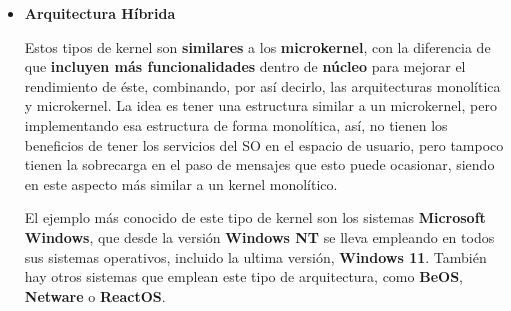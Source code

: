 \begin{itemize}
    \item \textbf{Arquitectura Híbrida}

    Estos tipos de kernel son \textbf{similares} a los \textbf{microkernel}, con la diferencia de que \textbf{incluyen más funcionalidades} dentro de \textbf{núcleo} para mejorar el rendimiento de éste, combinando, por así decirlo, las arquitecturas monolítica y microkernel. La idea es tener una estructura similar a un microkernel, pero implementando esa estructura de forma monolítica, así, no tienen los beneficios de tener los servicios del SO en el espacio de usuario, pero tampoco tienen la sobrecarga en el paso de mensajes que esto puede ocasionar, siendo en este aspecto más similar a un kernel monolítico. \cite{wiki05}

    El ejemplo más conocido de este tipo de kernel son los sistemas \textbf{Microsoft Windows}, que desde la versión \textbf{Windows NT} se lleva empleando en todos sus sistemas operativos, incluido la ultima versión, \textbf{Windows 11}. También hay otros sistemas que emplean este tipo de arquitectura, como \textbf{BeOS}, \textbf{Netware} o \textbf{ReactOS}.


\end{itemize}



\newpage



